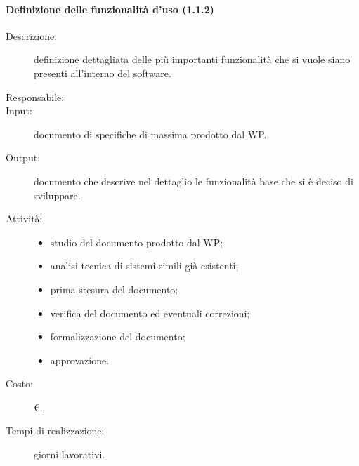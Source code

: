 \paragraph{Definizione delle funzionalità d'uso (1.1.2)}
\begin{description}
\item[Descrizione:] definizione dettagliata delle più importanti funzionalità che si vuole siano presenti all'interno del software.
\item[Responsabile:]
\item[Input:] documento di specifiche di massima prodotto dal WP.
\item[Output:] documento che descrive nel dettaglio le funzionalità base che si è deciso di sviluppare.
\item[Attività:]
\begin{itemize}
\item studio del documento prodotto dal WP;
\item analisi tecnica di sistemi simili già esistenti;
\item prima stesura del documento;
\item verifica del documento ed eventuali correzioni;
\item formalizzazione del documento;
\item approvazione.
\end{itemize}
\item[Costo:]  \euro{}.
\item[Tempi di realizzazione:]  giorni lavorativi.
\end{description}

